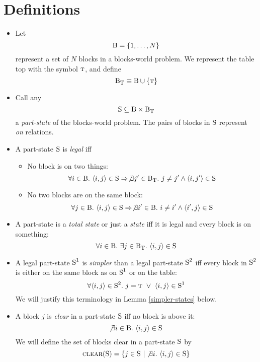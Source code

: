 \documentclass{article}
\newcommand{\implies}{\Rightarrow}
\newcommand{\have}{{.~}}
\newcommand{\bstate}{{\mbox{\cal S}}}
\newcommand{\blocks}{{\mbox{\cal B}}}
\newcommand{\tabtop}{{\mbox{\sc t}}}
\newcommand{\tblocks}{{\blocks_\tabtop}}
\newcommand{\bclear}{{\mbox{\sc clear}}}
\newcommand{\st}{~|}
\begin{document}
\section{Definitions}

\begin{itemize}
\item Let
  $$ \blocks = \{ 1, \ldots, N \} $$
represent a set of $N$ blocks in a blocks-world problem.
We represent the table top with the symbol $\tabtop$, and
define $$ \tblocks \equiv \blocks \cup \{ \tabtop \} $$
  
\item Call any 
  $$ \bstate \subseteq \blocks \times \tblocks $$
a {\em part-state} of the blocks-world problem. The pairs of blocks in
$\bstate$ represent {\em on} relations.

\item A part-state $\bstate$ is {\em legal} iff
  \begin{itemize}
  \item No block is on two things: $$
    \forall i \in \blocks \have
      \langle i , j \rangle \in \bstate \implies
      \not \exists j' \in \tblocks \have
	j \neq j' \wedge \langle i , j' \rangle \in \bstate
  $$
  \item No two blocks are on the same block: $$
    \forall j \in \blocks \have
      \langle i , j \rangle \in \bstate \implies
      \not \exists i' \in \blocks \have
	i \neq i' \wedge \langle i' , j \rangle \in \bstate
  $$
  \end{itemize}

\item A part-state is a {\em total state} or just a {\em state}
iff it is legal and every block is on something: $$
    \forall i \in \blocks \have
      \exists j \in \tblocks \have
	\langle i , j \rangle \in \bstate
$$

\item A legal part-state $\bstate^1$ is {\em simpler} than
a legal part-state $\bstate^2$ iff every block in $\bstate^2$
is either on the same block as on $\bstate^1$ or on the
table: $$
  \forall \langle i, j \rangle \in \bstate^2 \have
    j = \tabtop ~\vee~ \langle i, j \rangle \in \bstate^1
$$
We will justify this terminology in Lemma \ref{simpler-states}
below.
  
\item A block $j$ is {\em clear} in a part-state $\bstate$ iff no block
is above it: $$
  \not \exists i \in \blocks \have \langle i , j \rangle \in \bstate
$$
We will define the set of blocks clear in a part-state $\bstate$ by $$
  \bclear(\bstate) = \{ j \in \bstate \st
  \not \exists i \have \langle i , j \rangle \in \bstate \}
$$


\end{itemize}
\end{document}
